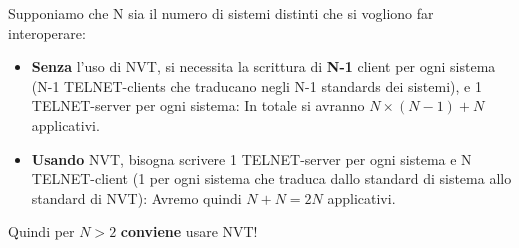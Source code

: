 \documentclass[11pt,a4paper,oneside]{book}
\theoremstyle{definition}
\begin{document}
Supponiamo che N sia il numero di sistemi distinti che si vogliono far
interoperare:
\begin{itemize}
	\item \textbf{Senza} l'uso di NVT, si necessita la scrittura di \textbf{N-1} client per ogni sistema (N-1 TELNET-clients che traducano negli N-1 standards dei sistemi), e 1 TELNET-server per ogni sistema: \newline
	      In totale si avranno $N\times(N-1) + N$ applicativi.
	\item \textbf{Usando} NVT, bisogna scrivere 1 TELNET-server per ogni sistema e N TELNET-client (1 per ogni sistema che traduca dallo standard di sistema allo standard di NVT): \newline Avremo quindi $N + N = 2N$ applicativi.
\end{itemize}
Quindi per $N > 2$ \textbf{conviene} usare NVT!

\pagebreak
\end{document}
